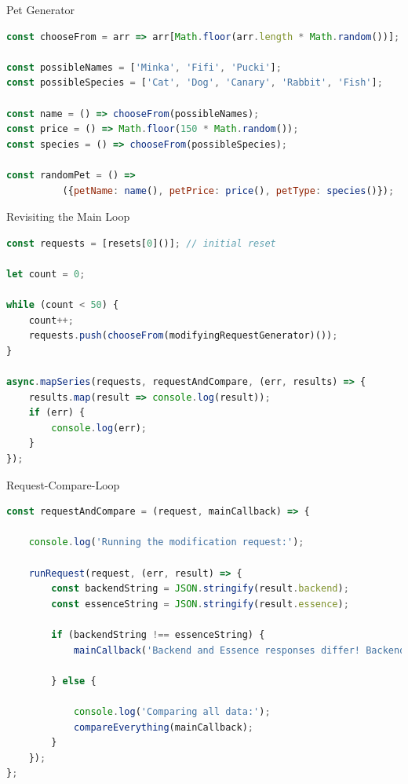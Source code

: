 \begin{frame}[fragile]{Pet Generator}

\begin{lstlisting}[language=JavaScript]
const chooseFrom = arr => arr[Math.floor(arr.length * Math.random())];

const possibleNames = ['Minka', 'Fifi', 'Pucki'];
const possibleSpecies = ['Cat', 'Dog', 'Canary', 'Rabbit', 'Fish'];

const name = () => chooseFrom(possibleNames);
const price = () => Math.floor(150 * Math.random());
const species = () => chooseFrom(possibleSpecies);

const randomPet = () => 
          ({petName: name(), petPrice: price(), petType: species()});
\end{lstlisting}

\end{frame}

\begin{frame}[fragile]{Revisiting the Main Loop}

\begin{lstlisting}[language=JavaScript]
const requests = [resets[0]()]; // initial reset

let count = 0;

while (count < 50) {
    count++;
    requests.push(chooseFrom(modifyingRequestGenerator)());
}

async.mapSeries(requests, requestAndCompare, (err, results) => {
    results.map(result => console.log(result));
    if (err) {
        console.log(err);
    }
});
\end{lstlisting}

\end{frame}

\begin{frame}[fragile]{Request-Compare-Loop}

\begin{lstlisting}[language=JavaScript]
const requestAndCompare = (request, mainCallback) => {

    console.log('Running the modification request:');

    runRequest(request, (err, result) => {
        const backendString = JSON.stringify(result.backend);
        const essenceString = JSON.stringify(result.essence);
        
        if (backendString !== essenceString) {
            mainCallback('Backend and Essence responses differ! Backend: ' + backendString + ' - Essence: ' + essenceString);
            
        } else {
            
            console.log('Comparing all data:');
            compareEverything(mainCallback);
        }
    });
};
\end{lstlisting}

\end{frame}


